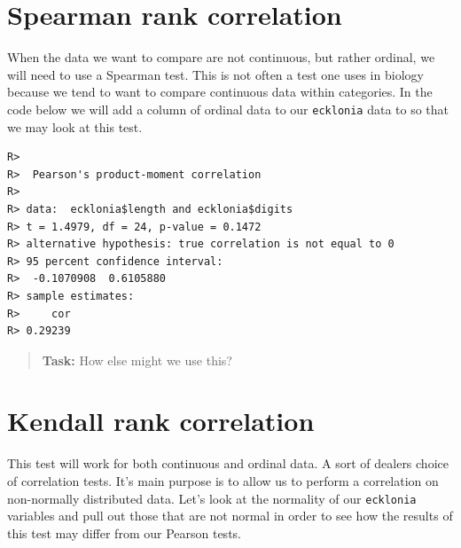 \documentclass[english,10pt,a4paper,oneside]{book}
\newenvironment{Shaded}{\begin{snugshade}}{\end{snugshade}}
\newcommand{\CommentTok}[1]{\textcolor[rgb]{0.56,0.35,0.01}{\textit{#1}}}
\newcommand{\DataTypeTok}[1]{\textcolor[rgb]{0.13,0.29,0.53}{#1}}
\newcommand{\DecValTok}[1]{\textcolor[rgb]{0.00,0.00,0.81}{#1}}
\newcommand{\KeywordTok}[1]{\textcolor[rgb]{0.13,0.29,0.53}{\textbf{#1}}}
\newcommand{\NormalTok}[1]{#1}
\newcommand{\OperatorTok}[1]{\textcolor[rgb]{0.81,0.36,0.00}{\textbf{#1}}}
\newcommand{\StringTok}[1]{\textcolor[rgb]{0.31,0.60,0.02}{#1}}
\theoremstyle{definition}
\theoremstyle{definition}
\theoremstyle{definition}
\theoremstyle{remark}
\begin{document}
\hypertarget{spearman-rank-correlation}{%
\section{Spearman rank correlation}\label{spearman-rank-correlation}}

When the data we want to compare are not continuous, but rather ordinal,
we will need to use a Spearman test. This is not often a test one uses
in biology because we tend to want to compare continuous data within
categories. In the code below we will add a column of ordinal data to
our \texttt{ecklonia} data to so that we may look at this test.

\begin{Shaded}
\end{Shaded}

\begin{verbatim}
R> 
R>  Pearson's product-moment correlation
R> 
R> data:  ecklonia$length and ecklonia$digits
R> t = 1.4979, df = 24, p-value = 0.1472
R> alternative hypothesis: true correlation is not equal to 0
R> 95 percent confidence interval:
R>  -0.1070908  0.6105880
R> sample estimates:
R>     cor 
R> 0.29239
\end{verbatim}

\begin{quote}
\textbf{Task:} How else might we use this?
\end{quote}

\hypertarget{kendall-rank-correlation}{%
\section{Kendall rank correlation}\label{kendall-rank-correlation}}

This test will work for both continuous and ordinal data. A sort of
dealers choice of correlation tests. It's main purpose is to allow us to
perform a correlation on non-normally distributed data. Let's look at
the normality of our \texttt{ecklonia} variables and pull out those that
are not normal in order to see how the results of this test may differ
from our Pearson tests.
\end{document}
